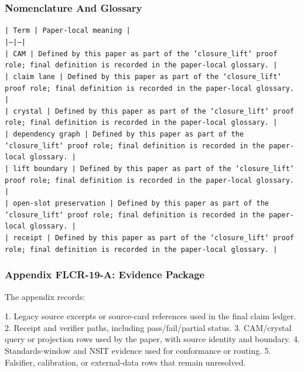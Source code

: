 \documentclass[11pt]{article}
\begin{document}
\subsubsection*{Nomenclature And Glossary}

\noindent\texttt{| Term | Paper-local meaning |}\\
\noindent\texttt{|---|---|}\\
\noindent\texttt{| CAM | Defined by this paper as part of the `closure\_lift` proof role; final definition is recorded in the paper-local glossary. |}\\
\noindent\texttt{| claim lane | Defined by this paper as part of the `closure\_lift` proof role; final definition is recorded in the paper-local glossary. |}\\
\noindent\texttt{| crystal | Defined by this paper as part of the `closure\_lift` proof role; final definition is recorded in the paper-local glossary. |}\\
\noindent\texttt{| dependency graph | Defined by this paper as part of the `closure\_lift` proof role; final definition is recorded in the paper-local glossary. |}\\
\noindent\texttt{| lift boundary | Defined by this paper as part of the `closure\_lift` proof role; final definition is recorded in the paper-local glossary. |}\\
\noindent\texttt{| open-slot preservation | Defined by this paper as part of the `closure\_lift` proof role; final definition is recorded in the paper-local glossary. |}\\
\noindent\texttt{| receipt | Defined by this paper as part of the `closure\_lift` proof role; final definition is recorded in the paper-local glossary. |}\\

\subsubsection*{Appendix FLCR-19-A: Evidence Package}

The appendix records:

1. Legacy source excerpts or source-card references used in the final claim ledger.
2. Receipt and verifier paths, including pass/fail/partial status.
3. CAM/crystal query or projection rows used by the paper, with source identity and boundary.
4. Standards-window and NSIT evidence used for conformance or routing.
5. Falsifier, calibration, or external-data rows that remain unresolved.
\end{document}
